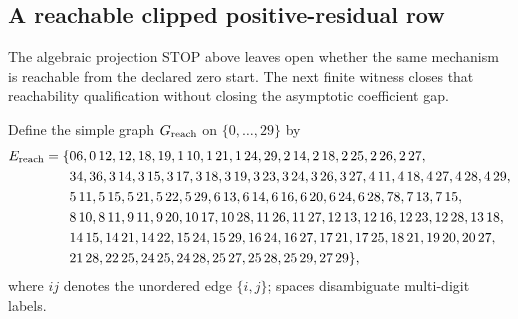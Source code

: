 \subsection{A reachable clipped positive-residual row}
\label{sec:reachable-positive-residual-projection}

The algebraic projection STOP above leaves open whether the same mechanism is
reachable from the declared zero start.  The next finite witness closes that
reachability qualification without closing the asymptotic coefficient gap.

Define the simple graph $G_{\rm reach}$ on $\{0,\ldots,29\}$ by
{\small
\begin{align*}
E_{\rm reach}=\{&
06,0\,12,12,18,19,1\,10,1\,21,1\,24,29,2\,14,2\,18,2\,25,2\,26,2\,27,\\
&34,36,3\,14,3\,15,3\,17,3\,18,3\,19,3\,23,3\,24,3\,26,3\,27,
4\,11,4\,18,4\,27,4\,28,4\,29,\\
&5\,11,5\,15,5\,21,5\,22,5\,29,6\,13,6\,14,6\,16,6\,20,6\,24,6\,28,
78,7\,13,7\,15,\\
&8\,10,8\,11,9\,11,9\,20,10\,17,10\,28,11\,26,11\,27,
12\,13,12\,16,12\,23,12\,28,13\,18,\\
&14\,15,14\,21,14\,22,15\,24,15\,29,16\,24,16\,27,17\,21,17\,25,
18\,21,19\,20,20\,27,\\
&21\,28,22\,25,24\,25,24\,28,25\,27,25\,28,25\,29,27\,29\},
\end{align*}}
where $ij$ denotes the unordered edge $\{i,j\}$; spaces disambiguate
multi-digit labels.

